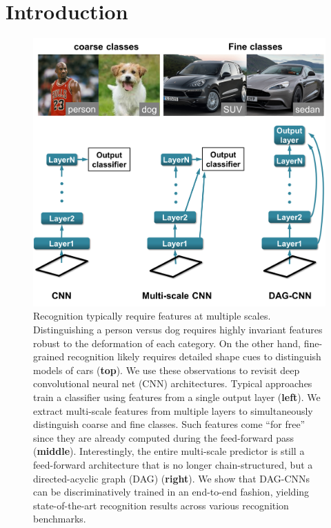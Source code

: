 \documentclass[10pt,twocolumn,letterpaper]{article}
\begin{document}
\section{Introduction}


\begin{figure}[t!]
\centering
\includegraphics[width=.9\columnwidth]{fig/splash}
\caption{Recognition typically require features at multiple scales. Distinguishing a person versus dog requires highly invariant features robust to the deformation of each category. On the other hand, fine-grained recognition likely requires detailed shape cues to distinguish models of cars ({\bf top}). We use these observations to revisit deep convolutional neural net (CNN) architectures. Typical approaches train a classifier using features from a single output layer ({\bf left}). We extract multi-scale features from multiple layers to simultaneously distinguish coarse and fine classes. Such features come ``for free'' since they are already computed during the feed-forward pass ({\bf middle}). Interestingly, the entire multi-scale predictor is still a feed-forward architecture that is no longer chain-structured, but a directed-acyclic graph (DAG) ({\bf right}). We show that DAG-CNNs can be discriminatively trained in an end-to-end fashion, yielding state-of-the-art recognition results across various recognition benchmarks. }%
\label{fig:splash}
\end{figure}
\end{document}
